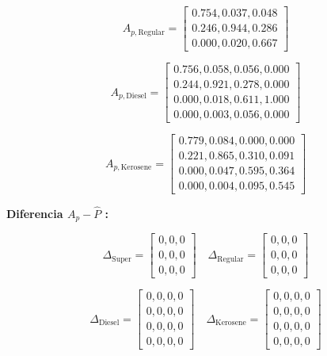 \begin{examplex}
\[
A_{p, \text{Regular}} = \begin{bmatrix}
0.754, 0.037, 0.048 \\
0.246, 0.944, 0.286 \\
0.000, 0.020, 0.667
\end{bmatrix}
\]

\[
A_{p, \text{Diesel}} = \begin{bmatrix}
0.756, 0.058, 0.056, 0.000 \\
0.244, 0.921, 0.278, 0.000 \\
0.000, 0.018, 0.611, 1.000 \\
0.000, 0.003, 0.056, 0.000
\end{bmatrix}
\]

\[
A_{p, \text{Kerosene}} = \begin{bmatrix}
0.779, 0.084, 0.000, 0.000 \\
0.221, 0.865, 0.310, 0.091 \\
0.000, 0.047, 0.595, 0.364 \\
0.000, 0.004, 0.095, 0.545
\end{bmatrix}
\]

\bigskip
\noindent\textbf{Diferencia \(A_p - \hat{P}\) :}

\[
\Delta_{\text{Super}} = \begin{bmatrix}
0, 0, 0 \\
0, 0, 0 \\
0, 0, 0
\end{bmatrix}
\quad
\Delta_{\text{Regular}} = \begin{bmatrix}
0, 0, 0 \\
0, 0, 0 \\
0, 0, 0 
\end{bmatrix}
\]

\[
\Delta_{\text{Diesel}} = \begin{bmatrix}
0, 0, 0, 0 \\
0, 0, 0, 0 \\
0, 0, 0, 0 \\
0, 0, 0, 0
\end{bmatrix}
\quad
\Delta_{\text{Kerosene}} = \begin{bmatrix}
0, 0, 0, 0 \\
0, 0, 0, 0 \\
0, 0, 0, 0 \\
0, 0, 0, 0
\end{bmatrix}
\]

\end{examplex}

